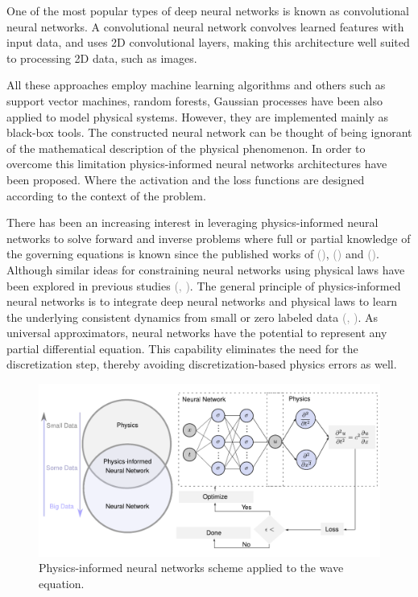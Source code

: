 \documentclass[11pt,twoside]{article}
\renewcommand{\citep}[2][]{\textcolor{gray}{(\citeauthor{#2}, \citeyear[#1]{#2})}}
\renewcommand{\citeauthoryear}[2][]{\textcolor{gray}{\citeauthor{#2} (\textcolor{gray}{\citeyear[#1]{#2}})}}
\begin{document}
One of the most popular types of deep neural networks is known as convolutional neural networks. A convolutional neural network convolves learned features with input data, and uses 2D convolutional layers, making this architecture well suited to processing 2D data, such as images.

 All these approaches employ machine learning algorithms and others such as support vector machines, random forests, Gaussian processes have been also applied to model physical systems. However, they are implemented mainly as black-box tools. The constructed neural network can be thought of being ignorant of the mathematical description of the physical phenomenon. In order to overcome this limitation physics-informed neural networks architectures have been proposed. Where the activation and the loss functions are designed according to the context of the problem.

There has been an increasing interest in leveraging physics-informed neural networks to solve forward and inverse problems where full or partial knowledge of the governing equations is known since the published works of \citeauthoryear{raissi_hidden_2018}, \citeauthoryear{raissi_numerical_2018} and \citeauthoryear{Raissi2019}. Although similar ideas for constraining neural networks using physical laws have been explored in previous studies \citep{lagaris_artificial_1998}. The general principle of physics-informed neural networks is to integrate deep neural networks and physical laws to learn the underlying consistent dynamics from small or zero labeled data \citep{karniadakis_physics-informed_2021}. As universal approximators, neural networks have the potential to represent any partial differential equation. This capability eliminates the need for the discretization step, thereby avoiding discretization-based physics errors as well. 


\begin{figure}
\centering
    \includegraphics[width=1.0\textwidth]{figs/Escheme_PINN_waves.pdf}
    \caption{Physics-informed neural networks scheme applied to the wave equation.}
    \label{deep_learning_subset_architecture}
\end{figure}
\end{document}
